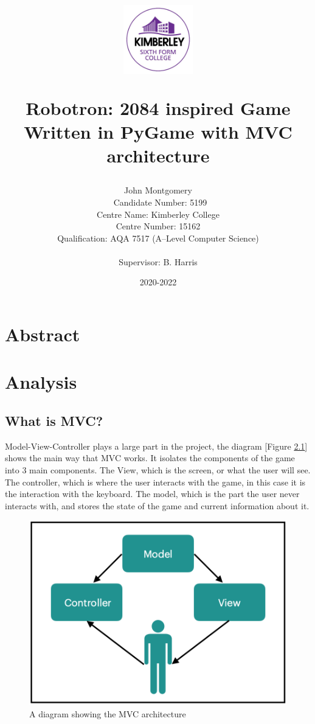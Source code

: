 \documentclass[a4paper, 11pt]{report}
\title{%
    
    \begin{center}
        \includegraphics[width=3cm]{kimberley.png}
        \centering
    \end{center}
  Robotron: 2084 inspired Game \\
  \large Written in PyGame with MVC architecture}
\author{{\Large John Montgomery}\\ \ 
Candidate Number: 5199\\
Centre Name: Kimberley College\\
Centre Number: 15162\\
Qualification: AQA 7517 (A--Level Computer Science)\\ \\
{\small Supervisor: B. Harris}}
\date{2020-2022}
\begin{document}
\maketitle

\newpage
\tableofcontents\thispagestyle{empty}
\newpage
\listoffigures\thispagestyle{empty}
\newpage
\chapter{Abstract}
    

\chapter{Analysis}
    


\section{What is MVC?}
Model-View-Controller plays a large part in the project, the diagram [Figure \ref{fig:MVC_overview}] shows the main way that MVC works. It isolates the components of the game into 3 main components. The View, which is the screen, or what the user will see. The controller, which is where the user interacts with the game, in this case it is the interaction with the keyboard. The model, which is the part the user never interacts with, and stores the state of the game and current information about it.

\begin{figure}[ht!]
  \includegraphics[width=\linewidth]{MVC overview.png}
  \caption{A diagram showing the MVC architecture}
  \label{fig:MVC_overview}
\end{figure}
\end{document}
